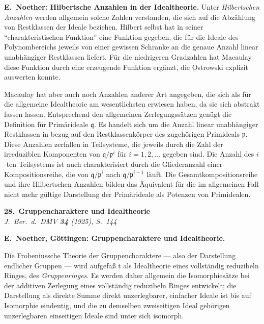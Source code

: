 \documentclass[12pt,a4paper]{article}
\begin{document}
{{\medskip
\textbf{E.~Noether: Hilbertsche Anzahlen in der Idealtheorie.} Unter \textit{Hilbertschen
Anzahlen} werden allgemein solche Zahlen verstanden, die sich auf die Abz\"{a}hlung
von Restklassen der Ideale beziehen. Hilbert selbst hat in seiner
``charakteristischen Funktion'' eine Funktion gegeben, die f\"{u}r die Ideale des
Polynombereichs jeweils von einer gewissen Schranke an die genaue Anzahl
linear unabh\"{a}ngiger Restklassen liefert. F\"{u}r die niedrigeren Gradzahlen
hat Macaulay diese Funktion durch eine erzeugende Funktion erg\"{a}nzt, die
Ostrowski explizit auswerten konnte.

Macaulay hat aber auch noch Anzahlen anderer Art angegeben, die
sich als f\"{u}r die allgemeine Idealtheorie am wesentlichsten erwiesen haben,
da sie sich abstrakt fassen lassen. Entsprechend den allgemeinen Zerlegungss\"{a}tzen
gen\"{u}gt die Definition f\"{u}r Prim\"{a}rideale $\mathfrak{q}$. Es handelt sich um die Anzahl
linear unabh\"{a}ngiger Restklassen in bezug auf den Restklassenk\"{o}rper des
zugeh\"{o}rigen Primideals $\mathfrak{p}$. Diese Anzahlen zerfallen in Teilsysteme, die
jeweils durch die Zahl der irreduziblen Komponenten von $\mathfrak{q}/\mathfrak{p}^{i}$ f\"{u}r
$i=1,2,\dots$ gegeben sind. Die Anzahl des $i$-ten Teilsystems ist auch
charakterisiert durch die Gliederanzahl einer Kompositionsreihe, die von
$\mathfrak{q}/\mathfrak{p}^{i}$ nach $\mathfrak{q}/\mathfrak{p}^{i-1}$ l\"{a}uft. Die Gesamtkompositionsreihe und ihre Hilbertschen
Anzahlen bilden das \"{A}quivalent f\"{u}r die im allgemeinen Fall nicht mehr g\"{u}ltige
Darstellung der Prim\"{a}rideale als Potenzen von Primidealen.

\newpage
\begin{center}
\Large\textbf{28.\ Gruppencharaktere und Idealtheorie}
\\[0.5em]
\normalsize\textit{J.\ Ber.\ d.\ DMV \textbf{34} (1925), S.~144}
\end{center}

\medskip
\noindent\textbf{E.~Noether, G\"{o}ttingen: Gruppencharaktere und Idealtheorie.}

Die Frobeniussche Theorie der Gruppencharaktere --- also der Darstellung
endlicher Gruppen --- wird aufgefa{\ss} t als Idealtheorie eines vollst\"{a}ndig reduzibeln
Ringes, des \textit{Gruppenringes}. Es werden daher allgemein die Isomorphies\"{a}tze
bei der additiven Zerlegung eines vollst\"{a}ndig reduzibeln Ringes entwickelt;
die Darstellung als direkte Summe direkt unzerlegbarer, einfacher Ideale ist
bis auf Isomorphie eindeutig, und die zu demselben zweiseitigen Ideal geh\"{o}rigen
unzerlegbaren einseitigen Ideale sind unter sich isomorph.

}}
\end{document}
